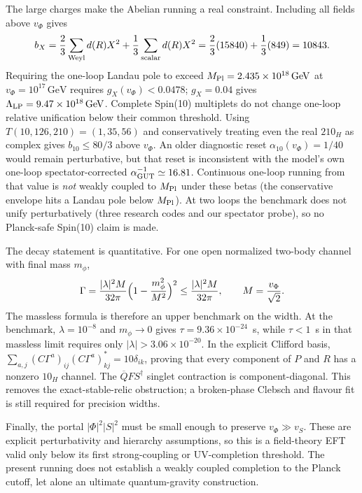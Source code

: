 \documentclass[11pt,a4paper]{article}
\newcommand{\GeV}{\,\mathrm{GeV}}
\begin{document}
The large charges make the Abelian running a real constraint. Including
all fields above $v_\Phi$ gives
\begin{equation}
 b_X=\frac23\sum_{\rm Weyl}d(R)X^2+
 \frac13\sum_{\rm scalar}d(R)X^2
 =\frac23(15840)+\frac13(849)=10843.
\end{equation}
Requiring the one-loop Landau pole to exceed
$M_{\rm Pl}=2.435\times10^{18}\GeV$ at $v_\Phi=10^{17}\GeV$ requires
$g_X(v_\Phi)<0.0478$; $g_X=0.04$ gives
$\Lambda_{\rm LP}=9.47\times10^{18}\GeV$. Complete Spin(10) multiplets
do not change one-loop relative unification below their common threshold.
Using $T(10,126,210)=(1,35,56)$ \cite{Chang} and conservatively treating
even the real $210_H$ as complex gives $b_{10}\leq80/3$ above $v_\Phi$.
An older diagnostic reset $\alpha_{10}(v_\Phi)=1/40$ would remain
perturbative, but that reset is inconsistent with the model's own
one-loop spectator-corrected $\alpha_{\rm GUT}^{-1}\simeq16.81$. Continuous
one-loop running from that value is \emph{not} weakly coupled to
$M_{\rm Pl}$ under these betas (the conservative envelope hits a Landau
pole below $M_{\rm Pl}$). At two loops the benchmark does not unify
perturbatively (three research codes and our spectator probe), so no
Planck-safe Spin(10) claim is made.

The decay statement is quantitative. For one open normalized two-body
channel with final mass $m_\phi$,
\begin{equation}
 \Gamma=\frac{|\lambda|^2M}{32\pi}\Bigl(1-\frac{m_\phi^2}{M^2}\Bigr)^2
 \le\frac{|\lambda|^2M}{32\pi},\qquad
 M=\frac{v_\Phi}{\sqrt2}.
\end{equation}
The massless formula is therefore an upper benchmark on the width. At the
benchmark, $\lambda=10^{-8}$ and $m_\phi\to0$ gives
$\tau=9.36\times10^{-24}$~s, while $\tau<1$~s in that massless limit
requires only $|\lambda|>3.06\times10^{-20}$. In the explicit Clifford basis,
$\sum_{a,j}(C\Gamma^a)_{ij}(C\Gamma^a)^*_{kj}=10\delta_{ik}$, proving
that every component of $P$ and $R$ has a nonzero $10_H$ channel. The
$\overline QFS^\dagger$ singlet contraction is component-diagonal. This
removes the exact-stable-relic obstruction; a broken-phase Clebsch and
flavour fit is still required for precision widths.

Finally, the portal
$|\Phi|^2|S|^2$ must be small enough to preserve $v_\Phi\gg v_S$.
These are explicit perturbativity and hierarchy assumptions, so this is a
field-theory EFT valid only below its first strong-coupling or UV-completion
threshold. The present running does not establish a weakly coupled completion
to the Planck cutoff, let alone an ultimate quantum-gravity construction.
\end{document}
